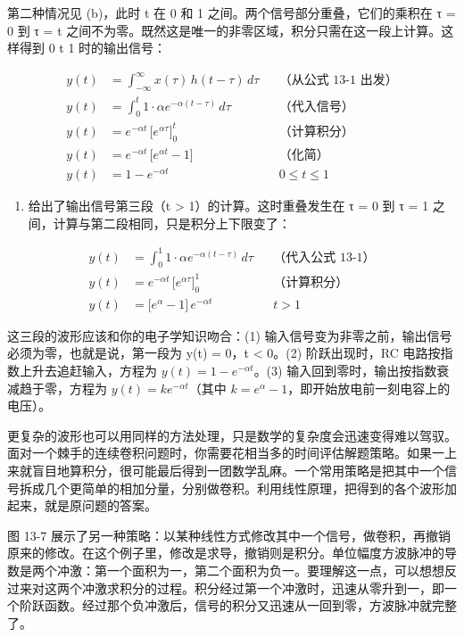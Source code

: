第二种情况见 (b)，此时 t 在 0 和 1 之间。两个信号部分重叠，它们的乘积在
τ = 0 到 τ = t
之间不为零。既然这是唯一的非零区域，积分只需在这一段上计算。这样得到 0
 t  1 时的输出信号：

\[
\begin{aligned}
y(t) &= \int_{-\infty}^{\infty} x(\tau)\, h(t-\tau)\, d\tau && \text{（从公式 13-1 出发）}\\
y(t) &= \int_{0}^{t} 1\cdot \alpha e^{-\alpha(t-\tau)}\, d\tau && \text{（代入信号）}\\
y(t) &= e^{-\alpha t}\,\Big[e^{\alpha\tau}\Big]_{0}^{t} && \text{（计算积分）}\\
y(t) &= e^{-\alpha t}\,\big[e^{\alpha t} - 1\big] && \text{（化简）}\\
y(t) &= 1 - e^{-\alpha t} && 0 \le t \le 1
\end{aligned}
\]

\begin{enumerate}
\def\labelenumi{(\alph{enumi})}
\setcounter{enumi}{2}
\tightlist
\item
  给出了输出信号第三段（t \textgreater{} 1）的计算。这时重叠发生在 τ = 0
  到 τ = 1 之间，计算与第二段相同，只是积分上下限变了：
\end{enumerate}

\[
\begin{aligned}
y(t) &= \int_{0}^{1} 1\cdot \alpha e^{-\alpha(t-\tau)}\, d\tau && \text{（代入公式 13-1）}\\
y(t) &= e^{-\alpha t}\,\Big[e^{\alpha\tau}\Big]_{0}^{1} && \text{（计算积分）}\\
y(t) &= \big[e^{\alpha} - 1\big]\, e^{-\alpha t} && t > 1
\end{aligned}
\]

这三段的波形应该和你的电子学知识吻合：(1)
输入信号变为非零之前，输出信号必须为零，也就是说，第一段为 y(t) = 0，t
\textless{} 0。(2) 阶跃出现时，RC 电路按指数上升去追赶输入，方程为
\(y(t) = 1 - e^{-\alpha t}\)。(3)
输入回到零时，输出按指数衰减趋于零，方程为
\(y(t) = k e^{-\alpha t}\)（其中
\(k = e^{\alpha} - 1\)，即开始放电前一刻电容上的电压）。

更复杂的波形也可以用同样的方法处理，只是数学的复杂度会迅速变得难以驾驭。面对一个棘手的连续卷积问题时，你需要花相当多的时间评估解题策略。如果一上来就盲目地算积分，很可能最后得到一团数学乱麻。一个常用策略是把其中一个信号拆成几个更简单的相加分量，分别做卷积。利用线性原理，把得到的各个波形加起来，就是原问题的答案。

图 13-7
展示了另一种策略：以某种线性方式修改其中一个信号，做卷积，再撤销原来的修改。在这个例子里，修改是求导，撤销则是积分。单位幅度方波脉冲的导数是两个冲激：第一个面积为一，第二个面积为负一。要理解这一点，可以想想反过来对这两个冲激求积分的过程。积分经过第一个冲激时，迅速从零升到一，即一个阶跃函数。经过那个负冲激后，信号的积分又迅速从一回到零，方波脉冲就完整了。

